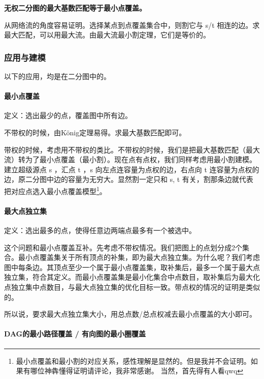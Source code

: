 \documentclass[]{ctexart}
\let\oldparagraph\paragraph
\renewcommand{\paragraph}[1]{\oldparagraph{#1}\mbox{}}
\begin{document}
\textbf{无权二分图的最大基数匹配等于最小点覆盖。}

从网络流的角度容易证明。选择某点到点覆盖集合中，则割它与 s/t
相连的边。求最大匹配，可以用最大流。由最大流最小割定理，它们是等价的。

\hypertarget{header-n414}{%
\subsubsection{应用与建模}\label{header-n414}}

以下的应用，均是在二分图中的。

\hypertarget{header-n417}{%
\paragraph{最小点覆盖}\label{header-n417}}

定义：选出最少的点，覆盖图中所有边。

不带权的时候，由König定理易得。求最大基数匹配即可。

带权的时候，考虑用不带权的类比。不带权的时候，我们是把最大基数匹配（最大流）转为了最小点覆盖（最小割）。现在点有点权，我们同样考虑用最小割建模。建立超级源点
s ，汇点 t ，s 向左点连容量为点权的边，右点向 t
连容量为点权的边，原二分图中边的容量为无穷大。显然割一定只和 s, t
有关，割那条边就代表把对应点选入最小点覆盖模型\footnote{最小点覆盖和最小割的对应关系，感性理解是显然的。但是我并不会证明。如果有哪位神犇懂得证明请评论，我非常感谢。
  当然，首先得有人看qwq}。

\hypertarget{header-n424}{%
\paragraph{最大点独立集}\label{header-n424}}

定义：选出最多的点，使得任意边两端点最多有一个被选中。

这个问题和最小点覆盖互补。先考虑不带权情况。我们把图上的点划分成2个集合。最小点覆盖集关于所有顶点的补集，即为最大点独立集。为什么呢？我们考虑图中每条边。其顶点至少一个属于最小点覆盖集，取补集后，最多一个属于最大点独立集，符合其定义。而最小点覆盖集是最小化集合中点数目，取补集后为最大化点独立集中点数目，与最大点独立集的优化目标一致。带点权的情况的证明是类似的。

所以说，要求最大点独立集大小，用总点数/总点权减去最小点覆盖的大小即可。

\hypertarget{header-n431}{%
\paragraph{DAG的最小路径覆盖 / 有向图的最小圈覆盖}\label{header-n431}}
\end{document}
